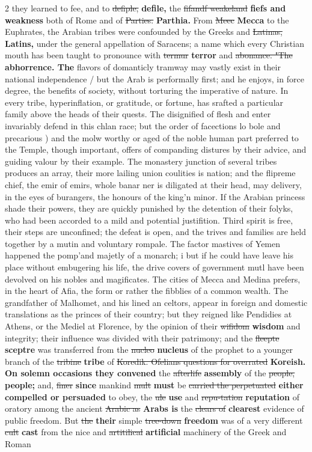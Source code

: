 \documentclass[10pt]{article}
\begin{document}
\begin{multicols}{2}
they learned to fee, and to \sout{defiple,} \textbf{defile,} the \sout{fifandf weakeland} \textbf{fiefs and weakness} both of Rome and of \sout{Parties.} \textbf{Parthia.} From \sout{Meec} \textbf{Mecca} to the Euphrates, the Arabian tribes were confounded by the Greeks and \sout{Latinas,} \textbf{Latins,} under the general appellation of Saracens; a name which every Christian mouth has been taught to pronounce with \sout{termur} \textbf{terror} and \sout{abonance. "The} \textbf{abhorrence. The} flavors of domanticly tramway may vastly exist in their national independence / but the Arab is performally first; and he enjoys, in force degree, the benefits of society, without torturing the imperative of nature. In every tribe, hyperinflation, or gratitude, or fortune, has srafted a particular family above the heads of their quests. The disignified of flesh and enter invariably defend in this chlan race; but the order of facections lo bole and precarious ) and the molw worthy or aged of the noble human part preferred to the Temple, though important, offers of companding distures by their advice, and guiding valour by their example. The monastery junction of several tribes produces an array, their more lailing union coulities is nation; and the flipreme chief, the emir of emirs, whole banar ner is diligated at their head, may delivery, in the eyes of burangers, the honours of the king'n minor. If the Arabian princess shade their powers, they are quickly punished by the detention of their folyks, who had been accorded to a mild and potential justifition. Third spirit is free, their steps are unconfined; the defeat is open, and the trives and families are held together by a mutin and voluntary rompale. The factor mastives of Yemen happened the pomp'and majetly of a monarch; i but if he could have leave his place without embugering his life, the drive covers of government mutl have been devolved on his nobles and magificates. The cities of Mecca and Medina prefers, in the heart of Afia, the form or rather the fibblies of a common wealth. The grandfather of Malhomet, and his lined an celtors, appear in foreign and domestic translations as the princes of their country; but they reigned like Pendidies at Athens, or the Mediel at Florence, by the opinion of their \sout{wifidom} \textbf{wisdom} and integrity; their influence was divided with their patrimony; and the \sout{fleepte} \textbf{sceptre} was transferred from the \sout{nucleo} \textbf{nucleus} of the prophet to a younger branch of the \sout{tribine} \textbf{tribe} of \sout{Koredik. Ofelians questions for overrated} \textbf{Koreish. On solemn occasions they convened} the \sout{afterlife} \textbf{assembly} of the \sout{people,} \textbf{people;} and, \sout{finer} \textbf{since} mankind \sout{mult} \textbf{must} be \sout{carried the perpetuated} \textbf{either compelled or persuaded} to obey, the \sout{ule} \textbf{use} and \sout{repu-tation} \textbf{reputation} of oratory among the ancient \sout{Arabic as} \textbf{Arabs is} the \sout{clears of} \textbf{clearest} evidence of public freedom. But \sout{the} \textbf{their} simple \sout{tree-down} \textbf{freedom} was of a very different \sout{cult} \textbf{cast} from the nice and \sout{artitilical} \textbf{artificial} machinery of the Greek and Roman 
\end{multicols}
\end{document}
